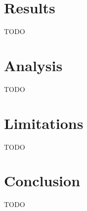 \documentclass{article}
\begin{document}
\section{Results}
TODO

\section{Analysis}
TODO

\section{Limitations}
TODO

\section{Conclusion}
TODO

\nocite{*}


\end{document}
